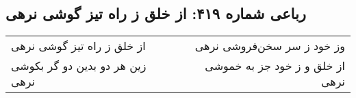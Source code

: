 \begin{center}
\section*{رباعی شماره ۴۱۹: از خلق ز راه تیز گوشی نرهی}
\label{sec:sh419}
\begin{longtable}{l p{0.5cm} r}
از خلق ز راه تیز گوشی نرهی
&&
وز خود ز سر سخن‌فروشی نرهی
\\
زین هر دو بدین دو گر بکوشی نرهی
&&
از خلق و ز خود جز به خموشی نرهی
\\
\end{longtable}
\end{center}
